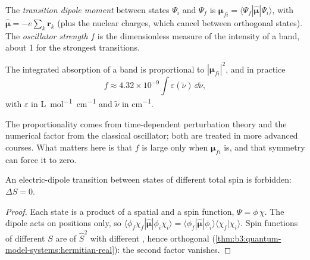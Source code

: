 \begin{definition}\label{def:b3:electronic-spectroscopy:transition-dipole}
The \emph{transition dipole moment} between
states $\Psi_i$ and $\Psi_f$ is $\boldsymbol\mu_{fi} = \langle\Psi_f|\hat{\boldsymbol\mu}|\Psi_i
\rangle$, with $\hat{\boldsymbol\mu} = -e\sum_k\mathbf r_k$ (plus the nuclear
charges, which cancel between orthogonal states). The \emph{oscillator
strength} $f$ is the dimensionless measure of the
intensity of a band, about 1 for the strongest transitions.
\end{definition}

\begin{proposition}\label{prop:b3:electronic-spectroscopy:intensity}
The integrated absorption of a band is proportional to $|\boldsymbol\mu_{fi}|^2$,
and in practice
\[
f \approx 4.32\times10^{-9}\int\varepsilon(\tilde\nu)\,\dd\tilde\nu,
\]
with $\varepsilon$ in \unit{L.mol^{-1}.cm^{-1}} and $\tilde\nu$ in \unit{cm^{-1}}.
\end{proposition}
\admitted

The proportionality comes from time-dependent perturbation theory and the
numerical factor from the classical oscillator; both are treated in more
advanced courses. What matters here is that $f$ is large only when
$\boldsymbol\mu_{fi}$ is, and that symmetry can force it to zero.

\begin{theorem}\label{thm:b3:electronic-spectroscopy:spin-rule}
An electric-dipole transition between states of different total spin is
forbidden: $\Delta S = 0$.
\end{theorem}

\begin{proof}
Each state is a product of a spatial and a spin function, $\Psi = \phi\,\chi$.
The dipole  acts on positions only, so $\langle\phi_f\chi_f|\hat{\boldsymbol\mu}|
\phi_i\chi_i\rangle = \langle\phi_f|\hat{\boldsymbol\mu}|\phi_i\rangle\langle\chi_f|\chi_i\rangle$.
Spin functions of different $S$ are  of $\hat S^2$ with different
, hence orthogonal (\cref{thm:b3:quantum-model-systems:hermitian-real}):
the second factor vanishes.
\end{proof}


